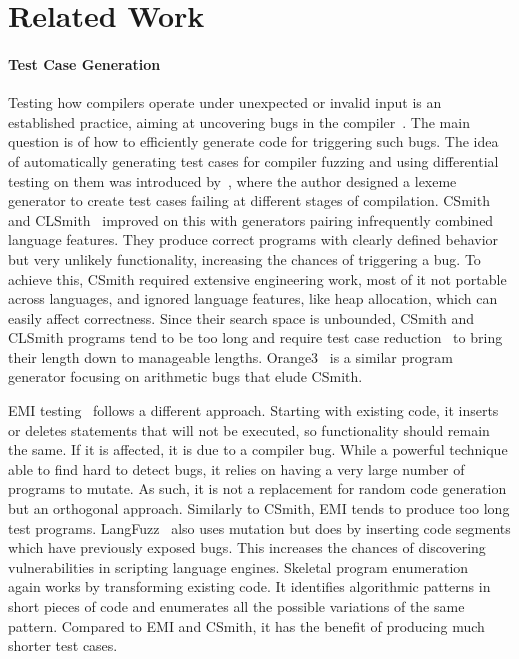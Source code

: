 \section{Related Work}\label{sec:rw}

\paragraph{Test Case Generation} 
Testing how compilers operate under unexpected or invalid input is an established practice, aiming at uncovering bugs in the compiler~\cite{Boujarwah1997}. The main question is of how to efficiently generate code for triggering such bugs. The idea of automatically generating test cases for compiler fuzzing and using differential testing on them was introduced by~\cite{McKeeman1998}, where the author designed a lexeme generator to create test cases failing at different stages of compilation. CSmith~\cite{Yang2011} and CLSmith~\cite{Lidbury2015a} improved on this with generators pairing infrequently combined language features. They produce correct programs with clearly defined behavior but very unlikely functionality, increasing the chances of triggering a bug. To achieve this, CSmith required extensive engineering work, most of it not portable across languages, and ignored language features, like heap allocation, which can easily affect correctness. Since their search space is unbounded, CSmith and CLSmith programs tend to be too long and require test case reduction~\cite{Regehr2012a,Pflanzer2016} to bring their length down to manageable lengths. Orange3~\cite{Nagai2013} is a similar program generator focusing on arithmetic bugs that elude CSmith. 

EMI testing~\cite{Le2013a,Le2015,Sun2016a} follows a different approach. Starting with existing code, it inserts or deletes statements that will not be executed, so functionality should remain the same. If it is affected, it is due to a compiler bug. While a powerful technique able to find hard to detect bugs, it relies on having a very large number of programs to mutate. As such, it is not a replacement for random code generation but an orthogonal approach. Similarly to CSmith, EMI tends to produce too long test programs. LangFuzz~\cite{Holler2012} also uses mutation but does by inserting code segments which have previously exposed bugs. This increases the chances of discovering vulnerabilities in scripting language engines. Skeletal program enumeration~\cite{Zhang2016a} again works by transforming existing code. It identifies algorithmic patterns in short pieces of code and enumerates all the possible variations of the same pattern. Compared to EMI and CSmith, it has the benefit of producing much shorter test cases. 

